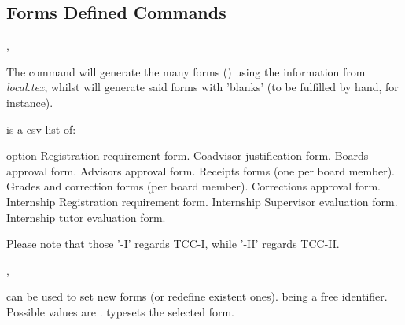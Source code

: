 \documentclass[article,nogeometry,english,tocdepth=3,secdepth=3]{ufrgscca} %
\begin{document}
\subsection{Forms Defined Commands}\label{forms.commands}
\begin{codedescribe}[code,update=2023/05/29]{\tcforms,\tcemptyforms}
	\begin{codesyntax}%
\end{codesyntax}
The command \tsmacro{\tcforms}{} will generate the many forms () using the information from \emph{local.tex}, whilst \tsmacro{\tcemptyforms}{} will generate said forms with 'blanks' (to be fulfilled by hand, for instance).

\end{codedescribe}

 is a csv list of:
\begin{describelist*}{option}
     {}
     { Registration requirement form.}
     {}
     { Coadvisor justification form.}
     {}
     { Boards approval form.}
     {}
     { Advisors approval form.}
     { Receipts forms (one per board member).}
     {}
     { Grades and correction forms (per board member).}
     {}
     { Corrections approval  form.}
     { Internship Registration requirement form.}
     { Internship Supervisor evaluation form.}
     { Internship tutor evaluation form.}
\end{describelist*}
Please note that those '-I' regards TCC-I, while '-II' regards TCC-II.

\begin{codedescribe}[code,new=2023/11/18]{\SetForm,\MakeForm}
	\begin{codesyntax}%
\end{codesyntax}
\tsobj{\SetForm} can be used to set new forms (or redefine existent ones).  being a free identifier. Possible  values are . \tsobj{\MakeForm} typesets the selected form.
\end{codedescribe}
\end{document}
